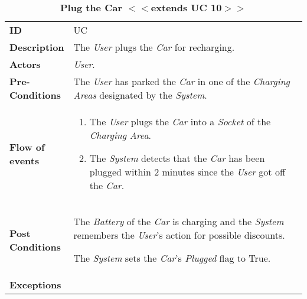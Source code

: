 \begin{longtable}{|p{0.2\linewidth} p{0.8\linewidth}|}
	\captionsetup{labelformat=empty} %
	\caption{\textbf{Plug the Car $<<$extends UC 10$>>$}} %
	\label{UC_PlugCar}%
	\\ \hline %
	
	\textbf{ID} & UC\theUseCaseIdCounter \\ \hline
	\textbf{Description} & The \emph{User} plugs the \emph{Car} for recharging. \\ \hline
	\textbf{Actors} & \emph{User}.\\ \hline
	\textbf{Pre-Conditions} & The \emph{User} has parked the \emph{Car} in one of the \emph{Charging Areas} designated by the \emph{System}. \\ \hline
	\textbf{Flow of events} & 
	\begin{enumerate}
		\item The \emph{User} plugs the \emph{Car} into a \emph{Socket} of the \emph{Charging Area}. 
		\item The \emph{System} detects that the \emph{Car} has been plugged within 2 minutes since the \emph{User} got off the \emph{Car}.
	\end{enumerate}	 \\ \hline
	\textbf{Post Conditions} & The \emph{Battery} of the \emph{Car} is charging and the \emph{System} remembers the \emph{User}'s action for possible discounts.
	
The \emph{System} sets the \emph{Car}'s \emph{Plugged} flag to True.
	\\ \hline
	\textbf{Exceptions} & \\ \hline
\end{longtable}

